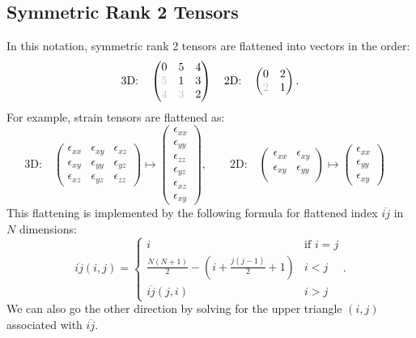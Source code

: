 \documentclass[10pt]{article}
\providecommand{\e}{\epsilon}
\begin{document}
\subsection{Symmetric Rank 2 Tensors}
In this notation, symmetric rank 2 tensors are flattened into vectors in the order:
$$
\text{3D:} \quad
\begin{pmatrix}
    0 & 5 & 4 \\
    \textcolor{lightgray}{5} & 1 & 3 \\
    \textcolor{lightgray}{4} & \textcolor{lightgray}{3} & 2
\end{pmatrix} \quad
\text{2D:} \quad
\begin{pmatrix}
    0 & 2 \\
    \textcolor{lightgray}{2} & 1
\end{pmatrix}.
$$
For example, strain tensors are flattened as:
$$
\text{3D:} \quad
\begin{pmatrix}
    \e_{xx} & \e_{xy} & \e_{xz} \\
    \e_{xy} & \e_{yy} & \e_{yz} \\
    \e_{xz} & \e_{yz} & \e_{zz}
\end{pmatrix} \mapsto
\begin{pmatrix}
    \e_{xx} \\
    \e_{yy} \\
    \e_{zz} \\
    \e_{yz} \\
    \e_{xz} \\
    \e_{xy}
\end{pmatrix}, \quad \quad
\text{2D:} \quad
\begin{pmatrix}
    \e_{xx} & \e_{xy}\\
    \e_{xy} & \e_{yy}\\
\end{pmatrix} \mapsto
\begin{pmatrix}
    \e_{xx} \\
    \e_{yy} \\
    \e_{xy}
\end{pmatrix} \quad
$$
This flattening is implemented by the following formula for flattened index
$\overline{ij}$ in $N$ dimensions:
$$
\overline{ij}(i, j) = \begin{cases}
    i & \text{if } i = j \\
    \frac{N (N + 1)}{2} - \left(i + \frac{j (j - 1)}{2} + 1\right) & i < j \\
    \overline{ij}(j, i)            & i > j
\end{cases} .
$$
We can also go the other direction by solving for the upper triangle $(i, j)$ associated with $\overline{ij}$.
\end{document}
